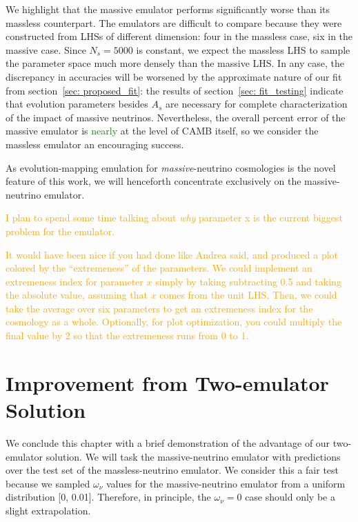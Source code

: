 We highlight that the massive emulator performs significantly worse than its 
massless counterpart. The emulators are difficult to compare because they
were constructed from LHSs of different dimension: four in the massless case,
six in the massive case. Since $N_s = 5000$ is constant, we expect the 
massless LHS to sample the parameter space much more densely than the massive
LHS. In any case, the discrepancy in accuracies will be worsened by the
approximate nature of our fit from section~\ref{sec: proposed_fit}:
the results of section~\ref{sec: fit_testing} indicate
that evolution parameters besides $A_s$ are necessary for complete
characterization of the impact of massive neutrinos. Nevertheless, the
overall percent error of the massive emulator is \textcolor{green}{nearly}
at the level of CAMB itself, so we consider the massless emulator an
encouraging success.

As evolution-mapping emulation for \textit{massive}-neutrino cosmologies
is the novel feature of this work, we will henceforth concentrate exclusively
on the massive-neutrino emulator.

\textcolor{orange}{I plan to spend some time talking 
about \textit{why} parameter x is the current biggest problem for the 
emulator.}

\textcolor{orange}{It would have been nice if you had done like Andrea said,
and produced a plot colored by the ``extremeness'' of the parameters. We
could implement an extremeness index for parameter $x$ simply by taking
subtracting 0.5 and taking the absolute value, assuming that $x$ comes from
the unit LHS. Then, we could take the average over six parameters to get
an extremeness index for the cosmology as a whole. Optionally, for plot
optimization, you could multiply the final value by 2 so that the extremeness
runs from 0 to 1.}


\section{Improvement from Two-emulator Solution}
\label{sec: 2emu_improvement}

We conclude this chapter with a brief demonstration of the advantage of our
two-emulator solution. We will task the massive-neutrino emulator with
predictions over the test set of the massless-neutrino emulator. We consider
this a fair test because we sampled $\omega_\nu$ values for the
massive-neutrino emulator from a uniform distribution [0, 0.01]. Therefore,
in principle, the $\omega_\nu = 0$ case should only be a slight extrapolation.

